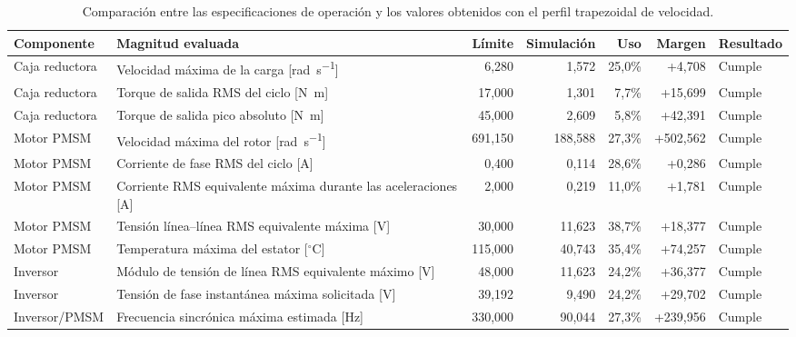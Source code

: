 \documentclass[10pt,a4paper]{article}
\begin{document}
\begin{table}[htbp]
	\centering
	\caption{Comparación entre las especificaciones de operación y los valores obtenidos con el perfil trapezoidal de velocidad.}
	\label{tab:limites_operacion_4a_trapecio}
	\scriptsize
	\setlength{\tabcolsep}{3.5pt}
	\begin{tabularx}{\textwidth}{@{}lXrrrrl@{}}
		\toprule
		\textbf{Componente} & \textbf{Magnitud evaluada} &
		\textbf{Límite} & \textbf{Simulación} &
		\textbf{Uso} & \textbf{Margen} & \textbf{Resultado} \\
		\midrule
		Caja reductora & Velocidad máxima de la carga [\si{\radian\per\second}] &
		6,280 & 1,572 & 25,0\% & +4,708 & Cumple \\
		
		Caja reductora & Torque de salida RMS del ciclo [\si{\newton\metre}] &
		17,000 & 1,301 & 7,7\% & +15,699 & Cumple \\
		
		Caja reductora & Torque de salida pico absoluto [\si{\newton\metre}] &
		45,000 & 2,609 & 5,8\% & +42,391 & Cumple \\
		
		Motor PMSM & Velocidad máxima del rotor [\si{\radian\per\second}] &
		691,150 & 188,588 & 27,3\% & +502,562 & Cumple \\
		
		Motor PMSM & Corriente de fase RMS del ciclo [\si{\ampere}] &
		0,400 & 0,114 & 28,6\% & +0,286 & Cumple \\
		
		Motor PMSM & Corriente RMS equivalente máxima durante las aceleraciones [\si{\ampere}] &
		2,000 & 0,219 & 11,0\% & +1,781 & Cumple \\
		
		Motor PMSM & Tensión línea--línea RMS equivalente máxima [\si{\volt}] &
		30,000 & 11,623 & 38,7\% & +18,377 & Cumple \\
		
		Motor PMSM & Temperatura máxima del estator [$^\circ$C] &
		115,000 & 40,743 & 35,4\% & +74,257 & Cumple \\
		
		Inversor & Módulo de tensión de línea RMS equivalente máximo [\si{\volt}] &
		48,000 & 11,623 & 24,2\% & +36,377 & Cumple \\
		
		Inversor & Tensión de fase instantánea máxima solicitada [\si{\volt}] &
		39,192 & 9,490 & 24,2\% & +29,702 & Cumple \\
		
		Inversor/PMSM & Frecuencia sincrónica máxima estimada [\si{\hertz}] &
		330,000 & 90,044 & 27,3\% & +239,956 & Cumple \\
		\bottomrule
	\end{tabularx}
\end{table}
\end{document}
